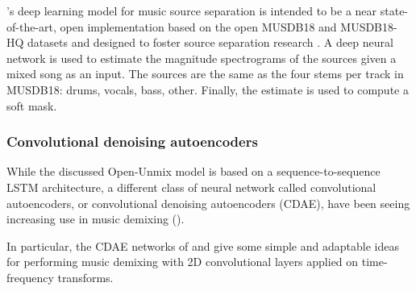\documentclass[report.tex]{subfiles}
\begin{document}
 \textcite{umx}'s deep learning model for music source separation is intended to be a near state-of-the-art, open implementation based on the open MUSDB18 and MUSDB18-HQ datasets and designed to foster source separation research \cite{musdb18, musdb18hq}. A deep neural network is used to estimate the magnitude spectrograms of the sources given a mixed song as an input. The sources are the same as the four stems per track in MUSDB18: drums, vocals, bass, other. Finally, the estimate is used to compute a soft mask.

 \subsubsection{Convolutional denoising autoencoders}

 While the discussed Open-Unmix model is based on a sequence-to-sequence LSTM architecture, a different class of neural network called convolutional autoencoders, or convolutional denoising autoencoders (CDAE), have been seeing increasing use in music demixing (\cite{plumbley1, plumbley2}).

 In particular, the CDAE networks of \textcite{plumbley1} and \textcite{plumbley2} give some simple and adaptable ideas for performing music demixing with 2D convolutional layers applied on time-frequency transforms.

\end{document}

